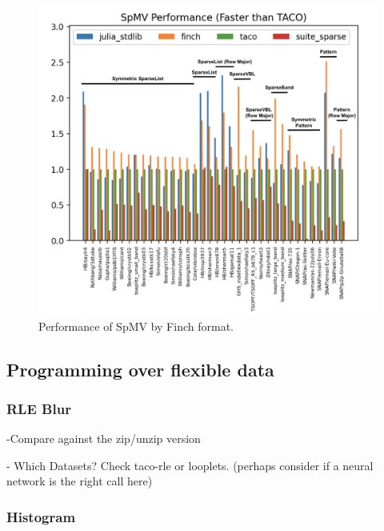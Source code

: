 \documentclass{article}
\begin{document}
\begin{figure}
    \includegraphics[width=\linewidth]{spmv_performance_grouped.png}
    \caption{Performance of SpMV by Finch format.}
\end{figure}


\subsection{Programming over flexible data}

\subsubsection{RLE Blur}

-Compare against the zip/unzip version

- Which Datasets? Check taco-rle or looplets.
(perhaps consider if a neural network is the right call here)

\subsubsection{Histogram}
\end{document}
